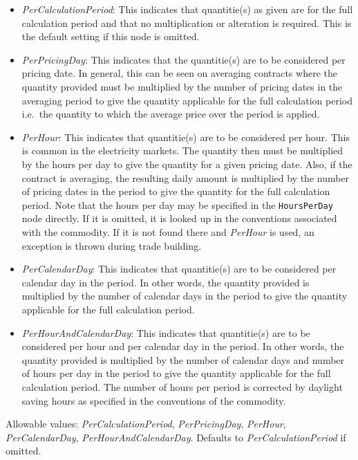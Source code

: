 \begin{itemize}
    \begin{itemize}
    \item \emph{PerCalculationPeriod}: This indicates that quantitie(s) as given are for the full calculation period and that no multiplication or alteration is required. This is the default setting if this node is omitted.
    \item  \emph{PerPricingDay}: This indicates that the quantitie(s) are to be considered per pricing date. In general, this can be seen on averaging contracts where the quantity provided must be multiplied by the number of pricing dates in the averaging period to give the quantity applicable for the full calculation period i.e.\ the quantity to which the average price over the period is applied.
    \item \emph{PerHour}: This indicates that quantitie(s) are to be considered per hour. This is common in the electricity markets. The quantity then must be multiplied by the hours per day to give the quantity for a given pricing date. Also, if the contract is averaging, the resulting daily amount is multiplied by the number of pricing dates in the period to give the quantity for the full calculation period. Note that the hours per day may be specified in the \lstinline!HoursPerDay! node directly. If it is omitted, it is looked up in the conventions associated with the commodity. If it is not found there and \emph{PerHour} is used, an exception is thrown during trade building.
    \item \emph{PerCalendarDay}: This indicates that quantitie(s) are to be considered per calendar day in the period. In other words, the quantity provided is multiplied by the number of calendar days in the period to give the quantity applicable for the full calculation period. 
    \item \emph{PerHourAndCalendarDay}: This indicates that quantitie(s) are to be considered per hour and per calendar day in the period. In other words, the quantity provided is multiplied by the number of calendar days and number of hours per day in the period to give the quantity applicable for the full calculation period. The number of hours per period is corrected by daylight saving hours as specified in the conventions of the commodity.
    \end{itemize}

Allowable values: \emph{PerCalculationPeriod}, \emph{PerPricingDay}, \emph{PerHour}, \emph{PerCalendarDay}, \emph{PerHourAndCalendarDay}. Defaults to \emph{PerCalculationPeriod} if omitted.


\end{itemize}

